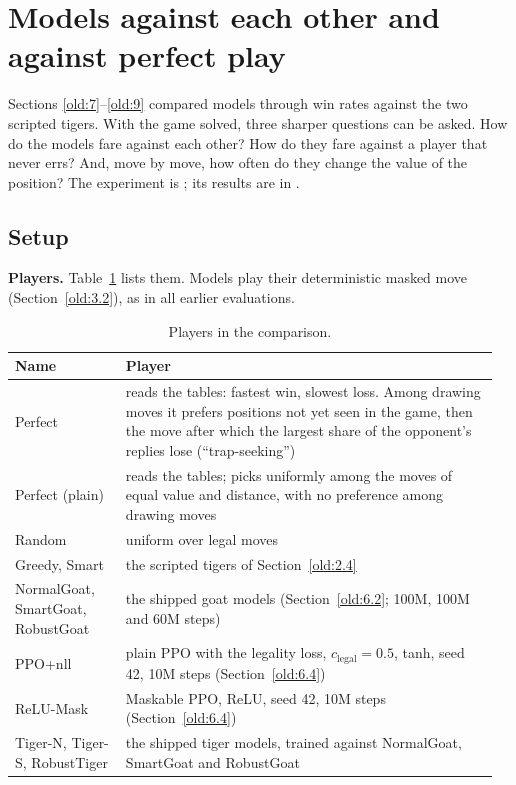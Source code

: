 \section{Models against each other and against perfect play}\label{sec:comparisons}

Sections \ref{old:7}--\ref{old:9} compared models through win rates against the two scripted tigers. With the
game solved, three sharper questions can be asked. How do the models fare against each other? How do they
fare against a player that never errs? And, move by move, how often do they change the value of the
position? The experiment is ; its results are in
.

\subsection{Setup}\label{sec:cmp-setup}

\textbf{Players.} Table~\ref{tab:players} lists them. Models play their deterministic masked move
(Section~\ref{old:3.2}), as in all earlier evaluations.

\begin{table}[H]
\centering\small
\caption{Players in the comparison.}\label{tab:players}
\begin{tabular}{@{}>{\raggedright\arraybackslash}p{0.22\linewidth}p{0.74\linewidth}@{}}
\toprule
Name & Player \\
\midrule
Perfect & reads the tables: fastest win, slowest loss. Among drawing moves it prefers positions not yet seen in the game, then the move after which the largest share of the opponent's replies lose (``trap-seeking'') \\
Perfect (plain) & reads the tables; picks uniformly among the moves of equal value and distance, with no preference among drawing moves \\
Random & uniform over legal moves \\
Greedy, Smart & the scripted tigers of Section~\ref{old:2.4} \\
NormalGoat, SmartGoat, RobustGoat & the shipped goat models (Section~\ref{old:6.2}; 100M, 100M and 60M steps) \\
PPO+nll & plain PPO with the legality loss, $c_{\text{legal}} = 0.5$, tanh, seed 42, 10M steps (Section~\ref{old:6.4}) \\
ReLU-Mask & Maskable PPO, ReLU, seed 42, 10M steps (Section~\ref{old:6.4}) \\
Tiger-N, Tiger-S, RobustTiger & the shipped tiger models, trained against NormalGoat, SmartGoat and RobustGoat \\
\bottomrule
\end{tabular}
\end{table}

